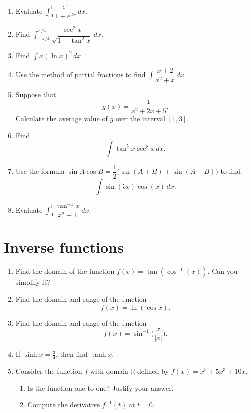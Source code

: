 \documentclass[10pt]{amsart}
\theoremstyle{plain}
\theoremstyle{definition}
\newcommand{\ds}{\displaystyle}
\newcommand{\dx}{\,dx}
\newcommand{\RR}{\mathbb{R}}
\begin{document}
\begin{enumerate}
\item Evaluate $\ds \int_0^1\dfrac{e^x}{1+e^{2x}}\dx$.

\item Find $\ds\int_{-\pi/4}^{\pi/4}\dfrac{\sec^2x}{\sqrt{1-\tan^2x}}\dx$.

\item Find $\ds\int x(\ln x)^2\dx$.

\item Use the method of partial fractions to find
$\ds\int \dfrac{x+2}{x^2 +x}\dx$.

\item Suppose that \[ g(x)=\dfrac{1}{x^2+2x+5}.\]
Calculate the average value of $g$ over the interval $[1, 3]$.

\item Find \[ \int \tan^5x\sec^8x\dx. \]

\item Use the formula $ \sin A\cos B = \dfrac{1}{2}\big(\sin(A+B)+\sin(A-B)\big)$
to find \[ \int \sin(3x)\cos(x)\dx. \]

\item Evaluate $\ds\int_0^1\dfrac{\tan^{-1}x}{x^2+1}\dx$. 
\end{enumerate}

\section{Inverse functions}

\begin{enumerate}
\item Find the domain of the function $f(x)=\tan(\cos^{-1}(x))$. Can you simplify it?

\item Find the domain and range of the function
\[ f(x)=\ln(\cos x). \]

\item Find the domain and range of the function
\[ f(x)=\sin^{-1}\Big(\dfrac{x}{|x|}\Big). \]

\item If $\sinh x =\tfrac{3}{4}$, then find $\tanh x$.

\item Consider the function $f$ with domain $\RR$ defined by $f(x)=x^5+5x^3+10x$.
\begin{enumerate}
\item Is the function one-to-one? Justify your answer.
\item Compute the derivative $f^{-1}(t)$ at $t=0$.
\end{enumerate}

\end{enumerate}
\end{document}
